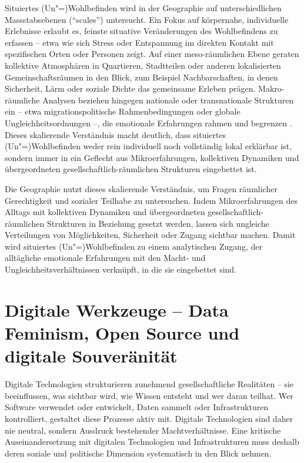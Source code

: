 Situiertes (Un\nobreakdash"=)Wohlbefinden wird in der Geographie auf unterschiedlichen Massstabsebenen (\enquote{scales}) untersucht. Ein Fokus auf körpernahe, individuelle Erlebnisse erlaubt es, feinste situative Veränderungen des Wohlbefindens zu erfassen -- etwa wie sich Stress oder Entspannung im direkten Kontakt mit spezifischen Orten oder Personen zeigt. Auf einer meso-räumlichen Ebene geraten kollektive Atmosphären in Quartieren, Stadtteilen oder anderen lokalisierten Gemeinschaftsräumen in den Blick, zum Beispiel Nachbarschaften, in denen Sicherheit, Lärm oder soziale Dichte das gemeinsame Erleben prägen. Makro-räumliche Analysen beziehen hingegen nationale oder transnationale Strukturen ein -- etwa migrationspolitische Rahmenbedingungen oder globale Ungleichheitsordnungen --, die emotionale Erfahrungen rahmen und begrenzen \parencite{howittScaleRelationMusical1998,marstonHumanGeographyScale2005}. Dieses skalierende Verständnis macht deutlich, dass situiertes (Un\nobreakdash"=)Wohlbefinden weder rein individuell noch vollständig lokal erklärbar ist, sondern immer in ein Geflecht aus Mikroerfahrungen, kollektiven Dynamiken und übergeordneten gesellschaftlich-räumlichen Strukturen eingebettet ist.

Die Geographie nutzt dieses skalierende Verständnis, um Fragen räumlicher Gerechtigkeit und sozialer Teilhabe zu untersuchen. Indem Mikroerfahrungen des Alltags mit kollektiven Dynamiken und übergeordneten gesellschaftlich-räumlichen Strukturen in Beziehung gesetzt werden, lassen sich ungleiche Verteilungen von Möglichkeiten, Sicherheit oder Zugang sichtbar machen. Damit wird situiertes (Un\nobreakdash"=)Wohlbefinden zu einem analytischen Zugang, der alltägliche emotionale Erfahrungen mit den Macht- und Ungleichheitsverhältnissen verknüpft, in die sie eingebettet sind.

\section{Digitale Werkzeuge -- Data Feminism, Open Source und digitale Souveränität}
\label{sec:datafeminism}

Digitale Technologien strukturieren zunehmend gesellschaftliche Realitäten -- sie beeinflussen, was sichtbar wird, wie Wissen entsteht und wer daran teilhat. Wer Software verwendet oder entwickelt, Daten sammelt oder Infrastrukturen kontrolliert, gestaltet diese Prozesse aktiv mit. Digitale Technologien sind daher nie neutral, sondern Ausdruck bestehender Machtverhältnisse. Eine kritische Auseinandersetzung mit digitalen Technologien und Infrastrukturen muss deshalb deren soziale und politische Dimension systematisch in den Blick nehmen.

